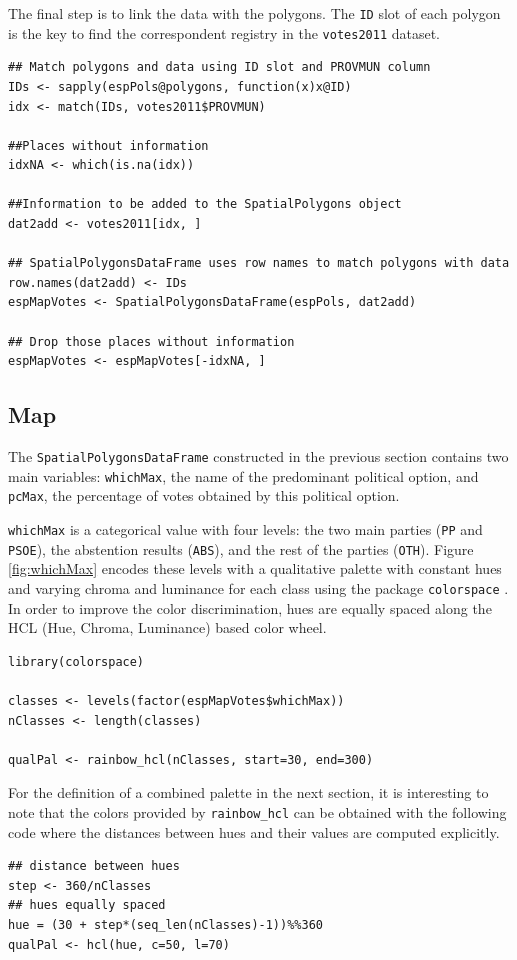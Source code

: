 The final step is to link the data with the polygons. The \texttt{ID} slot of
each polygon is the key to find the correspondent registry in the
\texttt{votes2011} dataset.
\lstset{language=R,numbers=none}
\begin{lstlisting}
## Match polygons and data using ID slot and PROVMUN column
IDs <- sapply(espPols@polygons, function(x)x@ID)
idx <- match(IDs, votes2011$PROVMUN)

##Places without information
idxNA <- which(is.na(idx))

##Information to be added to the SpatialPolygons object
dat2add <- votes2011[idx, ]

## SpatialPolygonsDataFrame uses row names to match polygons with data
row.names(dat2add) <- IDs
espMapVotes <- SpatialPolygonsDataFrame(espPols, dat2add)

## Drop those places without information
espMapVotes <- espMapVotes[-idxNA, ]
\end{lstlisting}
\subsection{Map}
\label{sec-1-2}
\label{sec:map}
The \texttt{SpatialPolygonsDataFrame} constructed in the previous section
contains two main variables: \texttt{whichMax}, the name of the predominant
political option, and \texttt{pcMax}, the percentage of votes obtained by
this political option.

\texttt{whichMax} is a categorical value with four levels: the two main
parties (\texttt{PP} and \texttt{PSOE}), the abstention results (\texttt{ABS}), and the
rest of the parties (\texttt{OTH}). Figure \ref{fig:whichMax} encodes these levels
with a qualitative palette with constant hues and varying chroma and
luminance for each class using the package \texttt{colorspace}
\cite{Zeileis.Hornik.ea2009}. In order to improve the color
discrimination, hues are equally spaced along the HCL (Hue, Chroma,
Luminance) based color wheel.

\lstset{language=R,numbers=none}
\begin{lstlisting}
library(colorspace)  

classes <- levels(factor(espMapVotes$whichMax))
nClasses <- length(classes)

qualPal <- rainbow_hcl(nClasses, start=30, end=300)
\end{lstlisting}

For the definition of a combined palette in the next section, it is
interesting to note that the colors provided by \texttt{rainbow\_hcl} can be
obtained with the following code where the distances between hues and
their values are computed explicitly.
\lstset{language=R,numbers=none}
\begin{lstlisting}
## distance between hues
step <- 360/nClasses 
## hues equally spaced
hue = (30 + step*(seq_len(nClasses)-1))%%360 
qualPal <- hcl(hue, c=50, l=70)
\end{lstlisting}

